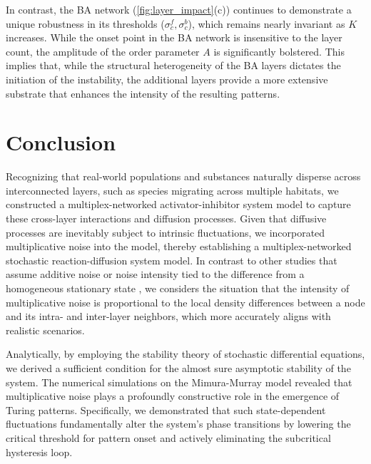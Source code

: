 \documentclass{SCIS2026}
\begin{document}
In contrast, the BA network (\cref{fig:layer_impact}(c)) continues to demonstrate a unique robustness in its thresholds ($\sigma_c^f, \sigma_c^b$), which remains nearly invariant as $K$ increases.
While the onset point in the BA network is insensitive to the layer count, the amplitude of the order parameter $A$ is significantly bolstered.
This implies that, while the structural heterogeneity of the BA layers dictates the initiation of the instability, the additional layers provide a more extensive substrate that enhances the intensity of the resulting patterns.

\section{Conclusion}\label{conclusion}

Recognizing that real-world populations and substances naturally disperse across interconnected layers, such as species migrating across multiple habitats, we constructed a multiplex-networked activator-inhibitor system model to capture these cross-layer interactions and diffusion processes.
Given that diffusive processes are inevitably subject to intrinsic fluctuations, we incorporated multiplicative noise into the model, thereby establishing a multiplex-networked stochastic reaction-diffusion system model.
In contrast to other studies that assume additive noise \cite{Karig2018,Asllani2013} or noise intensity tied to the difference from a homogeneous stationary state \cite{Xiao2023}, we considers the situation that the intensity of multiplicative noise is proportional to the local density differences between a node and its intra- and inter-layer neighbors, which more accurately aligns with realistic scenarios.

Analytically, by employing the stability theory of stochastic differential equations, we derived a sufficient condition for the almost sure asymptotic stability of the system.
The numerical simulations on the Mimura-Murray model revealed that multiplicative noise plays a profoundly constructive role in the emergence of Turing patterns.
Specifically, we demonstrated that such state-dependent fluctuations fundamentally alter the system's phase transitions by lowering the critical threshold for pattern onset and actively eliminating the subcritical hysteresis loop.
\end{document}
